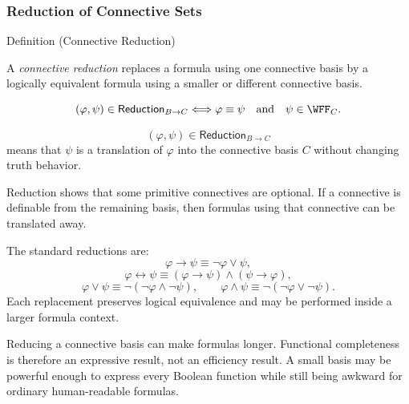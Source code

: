 \subsubsection*{Reduction of Connective Sets}

\begin{definitionbox}{Definition (Connective Reduction)}
\begin{definition}
\label{def:connective-reduction-propositional-logic}
A \emph{connective reduction} replaces a formula using one connective basis by
a logically equivalent formula using a smaller or different connective basis.
\end{definition}
\end{definitionbox}

\begin{remark*}
\[
(\varphi,\psi)\in\mathsf{Reduction}_{B\to C}
\Longleftrightarrow
\varphi\equiv\psi
\quad\text{and}\quad
\psi\in\WFF_C.
\]
\end{remark*}

\begin{remark*}
\[
  (\varphi,\psi)\in\mathsf{Reduction}_{B\to C}
\] means that \(\psi\) is a
translation of \(\varphi\) into the connective basis \(C\) without changing truth
behavior.
\end{remark*}

\begin{remark*}[Interpretation]
Reduction shows that some primitive connectives are optional. If a connective is
definable from the remaining basis, then formulas using that connective can be
translated away.
\end{remark*}

\begin{remark*}[Exposition]
The standard reductions are:
\[
\varphi\to\psi\equiv\neg\varphi\lor\psi,
\]
\[
\varphi\leftrightarrow\psi
\equiv
(\varphi\to\psi)\land(\psi\to\varphi),
\]
\[
\varphi\lor\psi\equiv\neg(\neg\varphi\land\neg\psi),
\qquad
\varphi\land\psi\equiv\neg(\neg\varphi\lor\neg\psi).
\]
Each replacement preserves logical equivalence and may be performed inside a
larger formula context.
\end{remark*}

\begin{remark*}[Exposition]
Reducing a connective basis can make formulas longer. Functional completeness is
therefore an expressive result, not an efficiency result. A small basis may be
powerful enough to express every Boolean function while still being awkward for
ordinary human-readable formulas.
\end{remark*}

